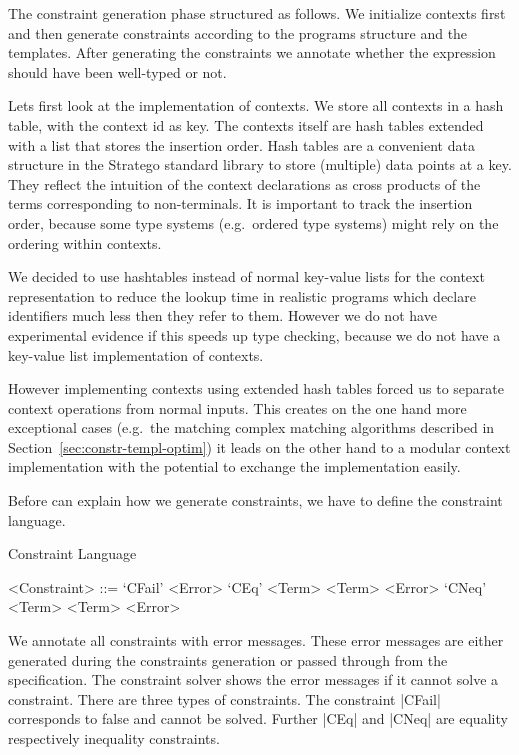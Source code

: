 The constraint generation phase structured as follows. We initialize
contexts first and then generate constraints according to the programs
structure and the templates. After generating the constraints we
annotate whether the expression should have been well-typed or not.

Lets first look at the implementation of contexts. We store all
contexts in a hash table, with the context id as key. The contexts
itself are hash tables extended with a list that stores the insertion
order. Hash tables are a convenient data structure in the Stratego
standard library to store (multiple) data points at a key. They
reflect the intuition of the context declarations as cross products of
the terms corresponding to non-terminals. It is important to track the
insertion order, because some type systems (e.g.\ ordered type
systems) might rely on the ordering within contexts.

We decided to use hashtables instead of normal key-value lists for the
context representation to reduce the lookup time in realistic programs
which declare identifiers much less then they refer to them. However
we do not have experimental evidence if this speeds up type checking,
because we do not have a key-value list implementation of contexts.

However implementing contexts using extended hash tables forced us to
separate context operations from normal inputs. This creates on the
one hand more exceptional cases (e.g.\ the matching complex matching
algorithms described in Section~\ref{sec:constr-templ-optim}) it leads
on the other hand to a modular context implementation with the
potential to exchange the implementation easily.

Before can explain how we generate constraints, we have to define the
constraint language.

\begin{definition}{Constraint Language}
  \begin{grammar}
    <Constraint> ::= `CFail' <Error>
    \alt `CEq' <Term> <Term> <Error>
    \alt `CNeq' <Term> <Term> <Error>
  \end{grammar}
\end{definition}

We annotate all constraints with error messages. These error messages
are either generated during the constraints generation or passed
through from the specification. The constraint solver shows the error
messages if it cannot solve a constraint. There are three types of
constraints. The constraint \code|CFail| corresponds to false and
cannot be solved. Further \code|CEq| and \code|CNeq| are equality
respectively inequality constraints.


